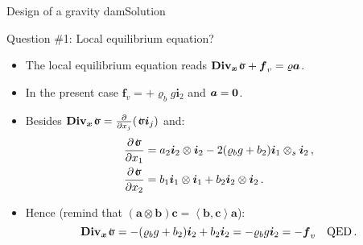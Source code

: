 \documentclass{beamer}
\newcommand{\aj}{a}
\newcommand{\bj}{b}
\newcommand{\cj}{c}
\newcommand{\av}{{\boldsymbol\aj}}
\newcommand{\bv}{{\boldsymbol\bj}}
\newcommand{\cv}{{\boldsymbol\cj}}
\newcommand{\xj}{x}
\newcommand{\xv}{{\boldsymbol\xj}}
\newcommand{\Div}{\mathbf{Div}}
\newcommand{\Divx}{{\Div_\xv}}
\renewcommand{\ij}{i}
\newcommand{\iv}{{\boldsymbol\ij}}
\newcommand{\fj}{f}
\newcommand{\fv}{{\boldsymbol\fj}}
\newcommand{\roi}{\varrho}
\newcommand{\stress}{\mbox{$\hspace{0.3em}\rotatebox[x=0pt,y=0.2pt]{90}{\rule{0.017\linewidth}{0.4pt}}\hspace{-0.25em}\upsigma$}}
\newcommand{\acj}{a}
\newcommand{\acv}{{\boldsymbol\acj}}
\newcommand{\bzero}{{\bf 0}}
\newcommand{\scal}[1]{\left\langle{#1}\right\rangle}
\begin{document}
\begin{frame}{Design of a gravity dam}{Solution}
\begin{overprint}
\vskip-20pt
\begin{exampleblock}{Question \#1: Local equilibrium equation?}
\begin{itemize}
\item The local equilibrium equation reads $\Divx\stress+\fv_v=\roi\acv$.
\item In the present case $\fv_v=+\roi_b g\iv_2$ and $\acv=\bzero$.
\item Besides $\Divx\stress=\frac{\partial}{\partial\xj_j}(\stress\iv_j)$ and:
\begin{displaymath}
\begin{split}
\frac{\partial\stress}{\partial\xj_1}&=a_2\iv_2\otimes\iv_2-2(\roi_b g+b_2)\iv_1\otimes_s\iv_2\,, \\
\frac{\partial\stress}{\partial\xj_2} &=b_1\iv_1\otimes\iv_1+b_2\iv_2\otimes\iv_2\,. \\
\end{split}
\end{displaymath}
\item Hence (remind that $(\av\otimes\bv)\cv=\scal{\bv,\cv}\av$):
\begin{displaymath}
\Divx\stress=-(\roi_b g+b_2)\iv_2+b_2\iv_2=-\roi_b g\iv_2=-\fv_v\quad\text{QED}\,.
\end{displaymath}
\end{itemize}
\end{exampleblock}

\end{overprint}

\end{frame}
\end{document}
